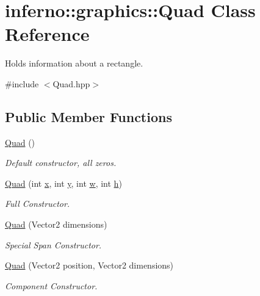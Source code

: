 \hypertarget{classinferno_1_1graphics_1_1_quad}{}\section{inferno\+:\+:graphics\+:\+:Quad Class Reference}
\label{classinferno_1_1graphics_1_1_quad}


Holds information about a rectangle.  




{\ttfamily \#include $<$Quad.\+hpp$>$}

\subsection*{Public Member Functions}
\begin{DoxyCompactItemize}
\item 
\mbox{\hyperlink{classinferno_1_1graphics_1_1_quad_a2f73b62580d65d3eea736df1ffccbd1c}{Quad}} ()
\begin{DoxyCompactList}\small\item\em Default constructor, all zeros. \end{DoxyCompactList}\item 
\mbox{\hyperlink{classinferno_1_1graphics_1_1_quad_af922171a2ab472086c5b423dbd42c019}{Quad}} (int \mbox{\hyperlink{classinferno_1_1graphics_1_1_quad_aed2540662e5f85e5ab467517dccaf90f}{x}}, int \mbox{\hyperlink{classinferno_1_1graphics_1_1_quad_af653ab1040d4647e88487287765f7404}{y}}, int \mbox{\hyperlink{classinferno_1_1graphics_1_1_quad_a7670f2faa1d1b88bb8202d4efa968899}{w}}, int \mbox{\hyperlink{classinferno_1_1graphics_1_1_quad_af5653f4d125b24ac94ab8367e310e541}{h}})
\begin{DoxyCompactList}\small\item\em Full Constructor. \end{DoxyCompactList}\item 
\mbox{\hyperlink{classinferno_1_1graphics_1_1_quad_ac5785c12620cbc18b091f3a83750ba72}{Quad}} (Vector2 dimensions)
\begin{DoxyCompactList}\small\item\em Special Span Constructor. \end{DoxyCompactList}\item 
\mbox{\hyperlink{classinferno_1_1graphics_1_1_quad_a374a4dd2744317ea37ff568800148b1f}{Quad}} (Vector2 position, Vector2 dimensions)
\begin{DoxyCompactList}\small\item\em Component Constructor. \end{DoxyCompactList}\item 

\end{DoxyCompactItemize}

